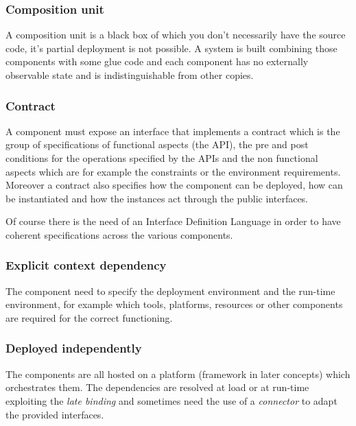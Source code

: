 \subsubsection{Composition unit}
A composition unit is a black box of which you don't necessarily have the source code, it's partial deployment is not possible.
A system is built combining those components with some glue code and each component has no externally observable state and is indistinguishable from other copies.

\subsubsection{Contract}
A component must expose an interface that implements a contract which is the group of specifications of functional aspects (the API), the pre and post conditions for the operations specified by the APIs and the non functional aspects which are for example the constraints or the environment requirements.
Moreover a contract also specifies how the component can be deployed, how can be instantiated and how the instances act through the public interfaces.

Of course there is the need of an Interface Definition Language in order to have coherent specifications across the various components.

\subsubsection{Explicit context dependency}
The component need to specify the deployment environment and the run-time environment, for example which tools, platforms, resources or other components are required for the correct functioning.

\subsubsection{Deployed independently}
The components are all hosted on a platform (framework in later concepts) which orchestrates them.
The dependencies are resolved at load or at run-time exploiting the \emph{late binding} and sometimes need the use of a \emph{connector} to adapt the provided interfaces.


